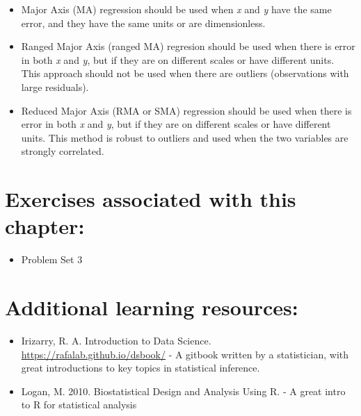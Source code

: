 \documentclass[]{book}
\providecommand{\tightlist}{%
  \setlength{\itemsep}{0pt}\setlength{\parskip}{0pt}}
\begin{document}
\begin{itemize}
\item
  Major Axis (MA) regression should be used when \emph{x} and \emph{y} have the same error, and they have the same units or are dimensionless.
\item
  Ranged Major Axis (ranged MA) regresion should be used when there is error in both \emph{x} and \emph{y}, but if they are on different scales or have different units. This approach should not be used when there are outliers (observations with large residuals).
\item
  Reduced Major Axis (RMA or SMA) regression should be used when there is error in both \emph{x} and \emph{y}, but if they are on different scales or have different units. This method is robust to outliers and used when the two variables are strongly correlated.
\end{itemize}

\hypertarget{exercises-associated-with-this-chapter-7}{%
\section{Exercises associated with this chapter:}\label{exercises-associated-with-this-chapter-7}}

\begin{itemize}
\tightlist
\item
  Problem Set 3
\end{itemize}

\hypertarget{additional-learning-resources-7}{%
\section{Additional learning resources:}\label{additional-learning-resources-7}}

\begin{itemize}
\item
  Irizarry, R. A. Introduction to Data Science. \url{https://rafalab.github.io/dsbook/} - A gitbook written by a statistician, with great introductions to key topics in statistical inference.
\item
  Logan, M. 2010. Biostatistical Design and Analysis Using R. - A great intro to R for statistical analysis
\end{itemize}


\end{document}
